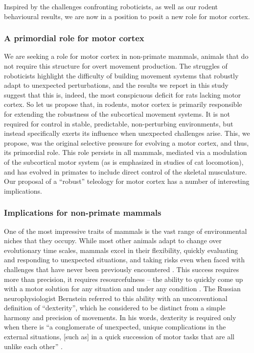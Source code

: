 Inspired by the challenges confronting roboticists, as well as our rodent behavioural results, we are now in a position to posit a new role for motor cortex.

\subsubsection*{A primordial role for motor cortex}

We are seeking a role for motor cortex in non-primate mammals, animals that do not require this structure for overt movement production. The struggles of roboticists highlight the difficulty of building movement systems that robustly adapt to unexpected perturbations, and the results we report in this study suggest that this is, indeed, the most conspicuous deficit for rats lacking motor cortex. So let us propose that, in rodents, motor cortex is primarily responsible for extending the robustness of the subcortical movement systems. It is not required for control in stable, predictable, non-perturbing environments, but instead specifically exerts its influence when unexpected challenges arise. This, we propose, was the original selective pressure for evolving a motor cortex, and thus, its primordial role. This role persists in all mammals, mediated via a modulation of the subcortical motor system (as is emphasized in studies of cat locomotion), and has evolved in primates to include direct control of the skeletal musculature. Our proposal of a ``robust'' teleology for motor cortex has a number of interesting implications.

\subsubsection*{Implications for non-primate mammals}

One of the most impressive traits of mammals is the vast range of environmental niches that they occupy. While most other animals adapt to change over evolutionary time scales, mammals excel in their flexibility, quickly evaluating and responding to unexpected situations, and taking risks even when faced with challenges that have never been previously encountered \cite{Spinka2001}. This success requires more than precision, it requires resourcefulness -- the ability to quickly come up with a motor solution for any situation and under any condition \cite{Bernstein1996}. The Russian neurophysiologist Bernstein referred to this ability with an unconventional definition of ``dexterity'', which he considered to be distinct from a simple harmony and precision of movements. In his words, dexterity is required only when there is \enquote{a conglomerate of unexpected, unique complications in the external situations, [such as] in a quick succession of motor tasks that are all unlike each other} \cite{Bernstein1996}.

